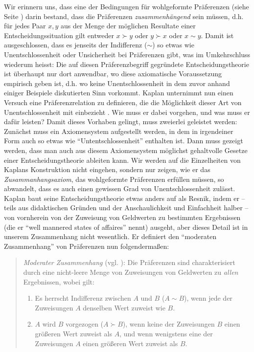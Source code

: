 Wir erinnern uns, dass eine der Bedingungen für wohlgeformte Präferenzen (siehe
Seite \pageref{Ordnungsaxiome}) darin bestand, dass die Präferenzen
{\em zusammenhängend} sein müssen, d.h. für jedes Paar $x, y$ aus
der Menge der möglichen Resultate einer Entscheidungssituation gilt entweder $x
\succ y$ oder $y \succ x$ oder $x \sim y$. Damit ist ausgeschlossen, dass es
jenseits der Indifferenz ($\sim$) so etwas wie Unentschlossenheit oder
Unsicherheit bei Präferenzen gibt, was im Umkehrschluss wiederum heisst: 
Die auf diesen Präferenzbegriff gegründete Entscheidungstheorie ist überhaupt
nur dort anwendbar, wo diese axiomatische Voraussetzung empirisch geben ist,
d.h. wo keine Unentschlossenheit in dem zuvor anhand einiger Beispiele
diskutierten Sinn vorkommt. 
Kaplan unternimmt nun einen Versuch eine
Präferenzrelation zu definieren, die die Möglichkeit dieser Art von
Unentschlossenheit mit einbezieht \cite[]{kaplan:1996}. Wie muss er
dabei vorgehen, und was muss er dafür leisten? Damit dieses Vorhaben gelingt,
muss zweierlei geleistet werden: Zunächst muss ein Axiomensystem aufgestellt
werden, in dem in irgendeiner Form auch so etwas wie "`Untentschlossenheit"'
enthalten ist. Dann muss gezeigt werden, dass man auch aus diesem Axiomensystem
möglichst gehaltvolle Gesetze einer Entscheidungstheorie ableiten kann. Wir
werden auf die Einzelheiten von Kaplans Konstruktion nicht eingehen, sondern
nur zeigen, wie er das {\em Zusammanhangsaxiom}, das wohlgeformte Präferenzen
erfüllen müssen, so abwandelt, dass es auch einen gewissen Grad von
Unentschlossenheit zulässt. Kaplan baut seine Entscheidungstheorie etwas anders
auf als Resnik, indem er -- teils aus didaktischen Gründen und der
Anschaulichkeit und Einfachheit halber -- von vornherein von der Zuweisung
von Geldwerten zu bestimmten Ergebnissen (die er "`well mannered states of
affaires"' nennt) ausgeht, aber dieses Detail ist in unserem Zusammenhang nicht
wesentlich. Er definiert den "`moderaten Zusammenhang"' von Präferenzen
nun folgendermaßen:

\begin{quote}
{\em Moderater Zusammenhang} (vgl. \cite[S. 13]{kaplan:1996}): Die Präferenzen
sind charakterisiert durch eine nicht-leere Menge von Zuweisungen von 
Geldwerten zu {\em allen} Ergebnissen,
wobei gilt: 
\begin{enumerate}
  \item Es herrscht Indifferenz zwischen $A$ und $B$ ($A \sim B$), wenn jede der
  Zuweisungen $A$ denselben Wert zuweist wie $B$.
  \item $A$ wird $B$ vorgezogen ($A \succ B$), wenn keine der Zuweisungen 
  $B$ einen größeren Wert zuweist als $A$, und wenn wenigstens eine der
  Zuweisungen $A$ einen größeren Wert zuweist als $B$.
\end{enumerate}
\end{quote}

